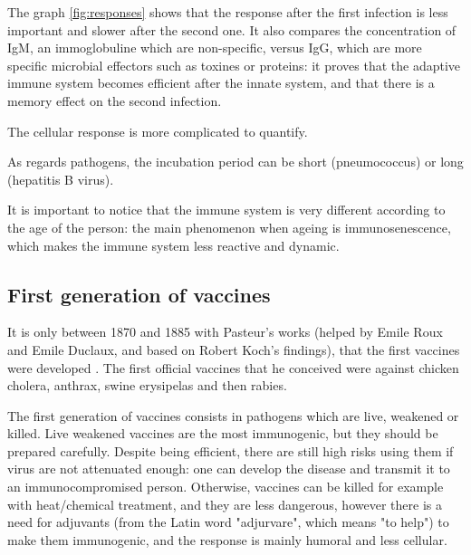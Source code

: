 \documentclass{article}
\begin{document}
\begin{itemize}
                        The graph \ref{fig:responses} shows that the response after the first infection is less important and slower after the second one.
                        It also compares the concentration of IgM, an immoglobuline which are non-specific, 
                            versus IgG, which are more specific microbial effectors such as toxines or proteins:
                            it proves that the adaptive immune system becomes efficient after the innate system, and that there is a memory effect on the second infection.                     

                        The cellular response is more complicated to quantify.

                        As regards pathogens, the incubation period can be short (pneumococcus) or long (hepatitis B virus).

                        It is important to notice that the immune system is very different according to the age of the person: the main phenomenon when ageing is immunosenescence,
                            which makes the immune system less reactive and dynamic.
                \end{itemize}
              
        \subsection{First generation of vaccines}
            
            It is only between 1870 and 1885 with Pasteur's works (helped by Emile Roux and Emile Duclaux, and based on Robert Koch's findings), 
                that the first vaccines were developed \autocite{plotkinHistoryVaccination2014}.
            The first official vaccines that he conceived were against chicken cholera, anthrax, swine erysipelas and then rabies.

            The first generation of vaccines consists in pathogens which are live, weakened or killed. Live weakened vaccines are the most immunogenic,
                but they should be prepared carefully. Despite being efficient, there are still high risks using them if virus are not attenuated enough:
                one can develop the disease and transmit it to an immunocompromised person. Otherwise, vaccines can be killed for example with heat/chemical treatment, and they
                are less dangerous, however there is a need for adjuvants (from the Latin word "adjurvare", which means "to help") 
                to make them immunogenic, and the response is mainly humoral and less cellular.
\end{document}

